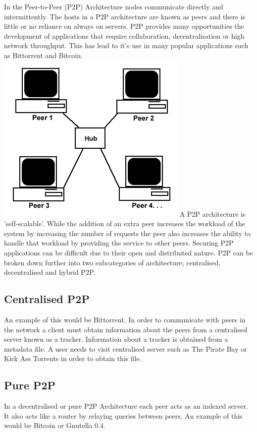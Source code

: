 \documentclass[11pt]{amsart}
\begin{document}
In the Peer-to-Peer (P2P) Architecture nodes communicate directly and intermittently. The hosts in a P2P architecture are known as peers and there is little or no reliance on always on servers. P2P provides many opportunities the development of applications that require collaboration, decentralisation or high network throughput. This has lead to it's use in many popular applications such as Bittorrent and Bitcoin.
\includegraphics[scale=1]{peertopeer}\cite{PeerToPeer}
A P2P architecture is 'self-scalable'. While the addition of an extra peer increases the workload of the system by increasing the number of requests the peer also increases the ability to handle that workload by providing the service to other peers. Securing P2P applications can be difficult due to their open and distributed nature.
P2P can be broken down further into two subcategories of architecture; centralised, decentralised and hybrid P2P.
\subsection{Centralised P2P}

An example of this would be Bittorrent. In order to communicate with peers in the network a client must obtain information about the peers from a centralised server known as a tracker. Information about a tracker is obtained from a metadata file. A user needs to visit centralised server such as The Pirate Bay or Kick Ass Torrents in order to obtain this file.

\subsection{Pure P2P}
In a decentralised or pure P2P Architecture each peer acts as an indexed server. It also acts like a router by relaying queries between peers. An example of this would be Bitcoin or Gnutella 0.4.
\end{document}
